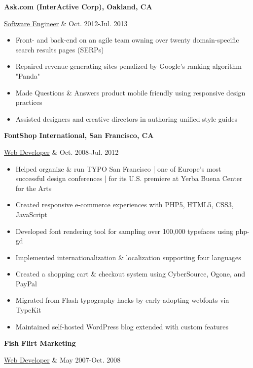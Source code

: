 \documentclass[margin,10pt]{res} %
\begin{document}
\begin{resume}
	{\bf Ask.com (InterActive Corp), Oakland, CA} \\
	\begin{ncolumn}{2} %
		\underline{Software Engineer} &   Oct. 2012-Jul. 2013
	\end{ncolumn}

	\begin{itemize}
		\item Front- and back-end on an agile team owning over twenty domain-specific search results pages (SERPs)
		\item Repaired revenue-generating sites penalized by Google's ranking algorithm "Panda"
		\item Made Questions \& Answers product mobile friendly using responsive design practices
		\item Assisted designers and creative directors in authoring unified style guides
	\end{itemize}

	{\bf FontShop International, San Francisco, CA} \\
	\begin{ncolumn}{2} %
		\underline{Web Developer} &   Oct. 2008-Jul. 2012
	\end{ncolumn}

	\begin{itemize}
		\item Helped organize \& run TYPO San Francisco | one of Europe's most successful design conferences | for its U.S. premiere at Yerba Buena Center for the Arts
		\item Created responsive e-commerce experiences with PHP5, HTML5, CSS3, JavaScript
		\item Developed font rendering tool for sampling over 100,000 typefaces using php-gd
		\item Implemented internationalization \& localization supporting four languages
		\item Created a shopping cart \& checkout system using CyberSource, Ogone, and PayPal
		\item Migrated from Flash typography hacks by early-adopting webfonts via TypeKit
		\item Maintained self-hosted WordPress blog extended with custom features
	\end{itemize}

	{\bf Fish Flirt Marketing} \\
	\begin{ncolumn}{2} %
		\underline{Web Developer} &   May 2007-Oct. 2008
	\end{ncolumn}



\end{resume}
\end{document}
